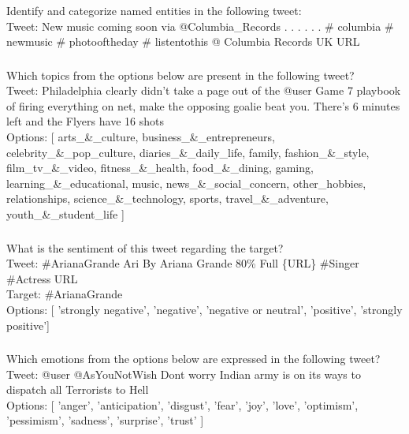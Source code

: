 \noindent Identify and categorize named entities in the following tweet: \\
\noindent Tweet: New music coming soon via @Columbia\_Records . . . . . . \# columbia \# newmusic \# photooftheday \# listentothis @ Columbia Records UK {URL}

\subsubsection*{{\TweetTopic}}
Which topics from the options below are present in the following tweet? \\
\noindent Tweet: Philadelphia clearly didn’t take a page out of the @user Game 7 playbook of firing everything on net, make the opposing goalie beat you.   There’s 6 minutes left and the Flyers have 16 shots \\
\noindent Options: [ arts\_\&\_culture, business\_\&\_entrepreneurs, celebrity\_\&\_pop\_culture, diaries\_\&\_daily\_life, family, fashion\_\&\_style, film\_tv\_\&\_video, fitness\_\&\_health, food\_\&\_dining, gaming, learning\_\&\_educational, music, news\_\&\_social\_concern, other\_hobbies, relationships, science\_\&\_technology, sports, travel\_\&\_adventure, youth\_\&\_student\_life ]

\subsubsection*{{\TweetSentiment}}
What is the sentiment of this tweet regarding the target? \\
\noindent Tweet: \#ArianaGrande Ari By Ariana Grande 80\% Full \{URL\} \#Singer \#Actress {URL} \\
\noindent Target: \#ArianaGrande \\
\noindent Options: [ 'strongly negative', 'negative', 'negative or neutral', 'positive', 'strongly positive'] 

\subsubsection*{{\TweetEmotion}}
Which emotions from the options below are expressed in the following tweet? \\
\noindent Tweet: @user @AsYouNotWish Dont worry Indian army is on its ways to dispatch all Terrorists to Hell \\
\noindent  Options: [ 'anger', 'anticipation', 'disgust', 'fear', 'joy', 'love', 'optimism', 'pessimism', 'sadness', 'surprise', 'trust' ]

